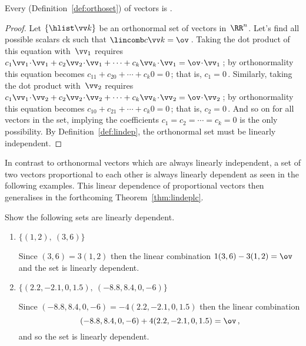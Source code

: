 \begin{theorem} \label{thm:ortholi}
Every  (Definition~\ref{def:orthoset}) of vectors is .
\end{theorem}
\begin{proof} %
Let \(\{\hlist\vv k\}\) be an orthonormal set of vectors in~\(\RR^n\).
Let's find all possible scalars \hlist ck such that \(\lincomb c\vv k=\ov\)\,.
Taking the dot product of this equation with~\(\vv_1\) requires
\(c_1\vv_1\cdot\vv_1+c_2\vv_2\cdot\vv_1+\cdots+c_k\vv_k\cdot\vv_1=\ov\cdot\vv_1\)\,;
by orthonormality this equation becomes
\(c_11+c_20+\cdots+c_k0=0\)\,; that is, \(c_1=0\)\,.
Similarly, taking the dot product with~\(\vv_2\) requires
\(c_1\vv_1\cdot\vv_2+c_2\vv_2\cdot\vv_2+\cdots+c_k\vv_k\cdot\vv_2=\ov\cdot\vv_2\)\,;
by orthonormality this equation becomes
\(c_10+c_21+\cdots+c_k0=0\)\,; that is, \(c_2=0\)\,.
And so on for all vectors in the set, implying the coefficients \(c_1=c_2=\cdots=c_k=0\) is the only possibility.
By Definition~\ref{def:lindep}, the orthonormal set must be linearly independent.
\end{proof}


In contrast to orthonormal vectors which are always linearly independent, a set of two vectors proportional to each other is always linearly dependent as seen in the following examples.
This linear dependence of proportional vectors then generalises in the forthcoming Theorem~\ref{thm:lindeplc}.




\begin{example} \label{eg:}
Show the following sets are linearly dependent.
\begin{enumerate}
\item \(\{(1,2),\ (3,6)\}\)
\begin{solution} 
Since \((3,6)=3(1,2)\) then the linear combination \(1(3,6)-3(1,2)=\ov\) and the set is linearly dependent. 
\end{solution}

\item \(\{(2.2,-2.1,0,1.5),\ (-8.8,8.4,0,-6)\}\)
\begin{solution} 
Since  \((-8.8,8.4,0,-6)=-4(2.2,-2.1,0,1.5)\) then the linear combination 
\begin{equation*}
(-8.8,8.4,0,-6)+4(2.2,-2.1,0,1.5)=\ov\,,
\end{equation*}
and so the set is linearly dependent.
\end{solution}
\end{enumerate}
\end{example}




